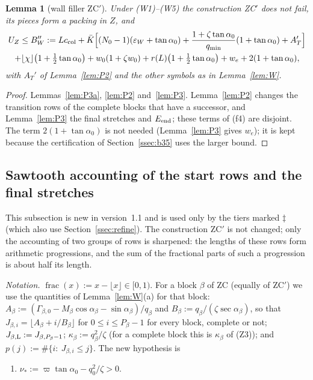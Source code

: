 \documentclass[11pt]{amsart}
\newcommand{\ca}{\cos\alpha}
\newcommand{\sa}{\sin\alpha}
\newcommand{\se}{\sec\alpha}
\newcommand{\taz}{\tan\alpha_0}
\newcommand{\Kb}{\bar K}
\newtheorem{lemma}[theorem]{Lemma}
\theoremstyle{definition}
\theoremstyle{remark}
\numberwithin{equation}{section}
\begin{document}
\begin{lemma}[wall filler ZC$'$]\label{lem:Wpp}
Under (W1)--(W5) the construction ZC$'$ does not fail, its pieces form a packing in $Z$, and
\begin{multline*}
U_Z\le B_W'':=Lc_{\rm col}+\Kb\Bigl[(N_0-1)(\varepsilon_W+\taz)+\frac{1+\zeta\taz}{q_{\min}}(1+\taz)+A_T'\Bigr]\\
+\lfloor\chi\rfloor\bigl(1+\tfrac12\taz\bigr)+w_0(1+\zeta w_0)+r(L)\bigl(1+\tfrac12\taz\bigr)+w_e+2(1+\taz),
\end{multline*}
with $A_T'$ of Lemma~\ref{lem:P2} and the other symbols as in Lemma~\ref{lem:W}.
\end{lemma}

\begin{proof}
Lemmas~\ref{lem:P3a}, \ref{lem:P2} and~\ref{lem:P3}. Lemma~\ref{lem:P2} changes the transition rows of the complete
blocks that have a successor, and Lemma~\ref{lem:P3} the final stretches and $E_{\rm end}$; these terms of (f4) are
disjoint. The term $2(1+\taz)$ is not needed (Lemma~\ref{lem:P3} gives $w_e$); it is kept because the certification of
Section~\ref{ssec:b35} uses the larger bound.
\end{proof}

\subsection{Sawtooth accounting of the start rows and the final stretches}\label{ssec:sawtooth}
This subsection is new in version~1.1 and is used only by the tiers marked $\ddagger$ (which also use
Section~\ref{ssec:refine}). The construction ZC$'$ is not changed; only the accounting of two groups of rows is
sharpened: the lengths of these rows form arithmetic progressions, and the sum of the fractional parts of such a
progression is about half its length.

\emph{Notation.} $\operatorname{frac}(x):=x-\lfloor x\rfloor\in[0,1)$. For a block $\beta$ of ZC (equally of ZC$'$) we use
the quantities of Lemma~\ref{lem:W}(a) for that block: $A_\beta:=(\Gamma_{\beta,0}-M_\beta\ca_\beta-\sa_\beta)/q_\beta$ and
$B_\beta:=q_\beta/(\zeta\se_\beta)$, so that $J_{\beta,i}=\lfloor A_\beta+i/B_\beta\rfloor$ for $0\le i\le P_\beta-1$ for
every block, complete or not; $J_{\beta,\rm L}:=J_{\beta,P_\beta-1}$; $\kappa_\beta:=q_\beta^2/\zeta$ (for a complete
block this is $\kappa_\beta$ of (Z3)); and $p(j):=\#\{i:\ J_{\beta,i}\le j\}$. The new hypothesis is
\begin{enumerate}[label=(W6)]
\item $\nu_*:=\varpi\taz-q_0^2/\zeta>0$.
\end{enumerate}
\end{document}
